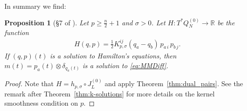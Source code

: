 \documentclass[12pt]{amsart}
\newcommand{\R}{\ensuremath{\mathbb{R}}}
\newtheorem{prop}[thm]{Proposition}
\begin{document}
  In summary we find:
  \begin{prop}[\S7 of \cite{MumfordMichor2013}] \label{prop:0-solutions}
  Let $p \geq \frac{n}{2} +1$ and $\sigma > 0$.
  Let $H:T^*Q_N^{(0)} \to \R$ be the function
  \begin{align*}
    H(q,p) =\frac{1}{2} K_{p,\sigma}^{ij}(q_a - q_b)\, p_{a\,i}\, p_{b\,j}.
  \end{align*}
  If $(q,p)(t)$ is a solution to Hamilton's equations, then
  $m(t) = p_a(t) \otimes \delta_{q_a(t)}$
  is a solution to \eqref{eq:MMDiff}.
\end{prop}
\begin{proof}
	Note that $H = h_{p,\sigma} \circ J_L^{(0)}$ and apply Theorem~\ref{thm:dual_pairs}.
  See the remark after Theorem~\ref{thm:k-solutions} for more details on the kernel smoothness condition on $p$.
\end{proof}
\end{document}
